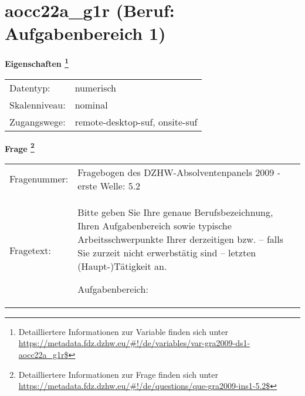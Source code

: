 
    \setcounter{footnote}{0}

    \vspace*{-1.8cm}
	\section{aocc22a\_g1r (Beruf: Aufgabenbereich 1)}
	\label{section:aocc22a_g1r}



    \vspace*{0.5cm}
    \noindent\textbf{Eigenschaften
	\footnote{Detailliertere Informationen zur Variable finden sich unter
		\url{https://metadata.fdz.dzhw.eu/\#!/de/variables/var-gra2009-ds1-aocc22a_g1r$}}}\\
	\begin{tabularx}{\hsize}{@{}lX}
	Datentyp: & numerisch \\
	Skalenniveau: & nominal \\
	Zugangswege: &
	  remote-desktop-suf, 
	  onsite-suf
 \\
    \end{tabularx}



				\vspace*{0.5cm}
                \noindent\textbf{Frage
	                \footnote{Detailliertere Informationen zur Frage finden sich unter
		              \url{https://metadata.fdz.dzhw.eu/\#!/de/questions/que-gra2009-ins1-5.2$}}}\\
				\begin{tabularx}{\hsize}{@{}lX}
					Fragenummer: &
					  Fragebogen des DZHW-Absolventenpanels 2009 - erste Welle:
					  5.2
 \\
					Fragetext: & Bitte geben Sie Ihre genaue Berufsbezeichnung, Ihren Aufgabenbereich sowie typische Arbeitsschwerpunkte Ihrer derzeitigen bzw. – falls Sie zurzeit nicht erwerbstätig sind – letzten (Haupt-)Tätigkeit an.\par  Aufgabenbereich: \\
				\end{tabularx}





